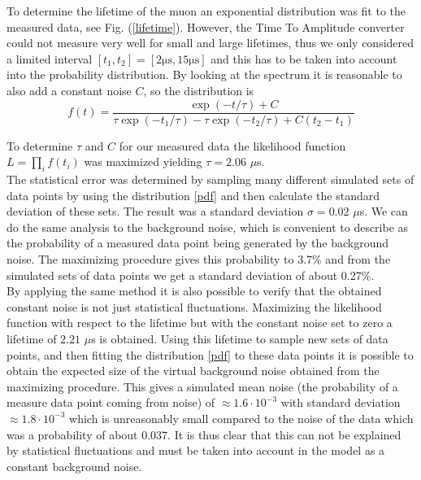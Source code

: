 \documentclass[10pt,twocolumn]{article}
\begin{document}
To determine the lifetime of the muon an exponential distribution was fit to the measured data, see Fig. (\ref{lifetime}). However, the Time To Amplitude converter could not measure very well for small and large lifetimes, thus we only considered a limited interval $[t_1,t_2]=[2 \mathrm{\mu s},15  \mathrm{\mu s}]$ and this has to be taken into account into the probability distribution. By looking at the spectrum it is reasonable to also add a constant noise $C$, so the distribution is
\begin{equation}
f(t)=\frac{\exp{(-t/\tau)}+C}{\tau\exp{(-t_1/\tau)}-\tau\exp{(-t_2/\tau)}+C(t_2-t_1)}\label{pdf}
\end{equation}

To determine $\tau$ and $C$ for our measured data the likelihood function $L=\prod_i f(t_i)$ was maximized yielding $\tau=2.06$ $\mu$s. \\

The statistical error was determined by sampling many different simulated sets of data points by using the distribution \eqref{pdf} and then calculate the standard deviation of these sets. The result was a standard deviation $\sigma=0.02$ $\mu$s. We can do the same analysis to the background noise, which is convenient to describe as the probability of a measured data point being generated by the background noise. The maximizing procedure gives this probability to 3.7\% and from the simulated sets of data points we get a standard deviation of about 0.27\%. %
\\

By applying the same method it is also possible to verify that the obtained constant noise is not just statistical fluctuations. Maximizing the likelihood function with respect to the lifetime but with the constant noise set to zero a lifetime of $2.21$ $\mu$s is obtained. Using this lifetime to sample new sets of data points, and then fitting the distribution \eqref{pdf} to these data points it is possible to obtain the expected size of the virtual background noise obtained from the maximizing procedure. This gives a simulated mean noise (the probability of a measure data point coming from noise) of $\approx1.6\cdot 10^{-3}$ with standard deviation $\approx1.8\cdot 10^{-3}$ which is unreasonably small compared to the noise of the data which was a probability of about $0.037$. It is thus clear that this can not be explained by statistical fluctuations and must be taken into account in the model as a constant background noise.\\
 
\end{document}
